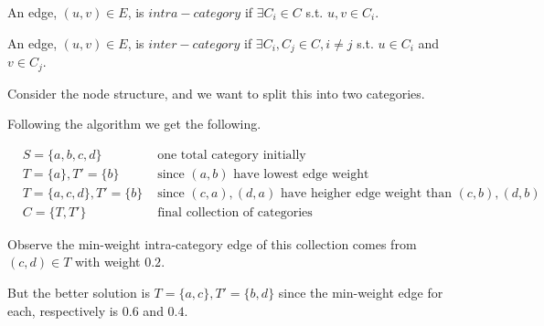 \begin{questions}
\begin{soln}
		An edge, \((u, v) \in E\), is \(intra-category\) if \(\exists C_i \in C\) s.t. \(u, v \in C_i\).

		An edge, \((u, v) \in E\), is \(inter-category\) if \(\exists C_i, C_j \in C, i \neq j\) s.t. \(u\in C_i\) and \(v \in C_j\).


		Consider the node structure, and we want to split this into two categories.


		Following the algorithm we get the following.

		\begin{align*}
			 & S  = \{a, b, c, d\}          & \text{ one total category initially }                                               \\
			 & T  = \{a\}, T' = \{b\}       & \text{ since } (a, b) \text{ have lowest edge weight}                               \\
			 & T  = \{a, c, d\}, T' = \{b\} & \text{ since } (c, a), (d, a) \text{ have heigher edge weight than } (c, b), (d, b) \\
			 & C = \{T, T'\}                & \text{ final collection of categories }
		\end{align*}

		Observe the min-weight intra-category edge of this collection comes from \((c, d) \in T\) with weight \(0.2\).

		But the better solution is \(T = \{a, c\}, T' = \{b, d\}\) since the min-weight edge for each, respectively is \(0.6\) and \(0.4\).


\end{soln}
\end{questions}
